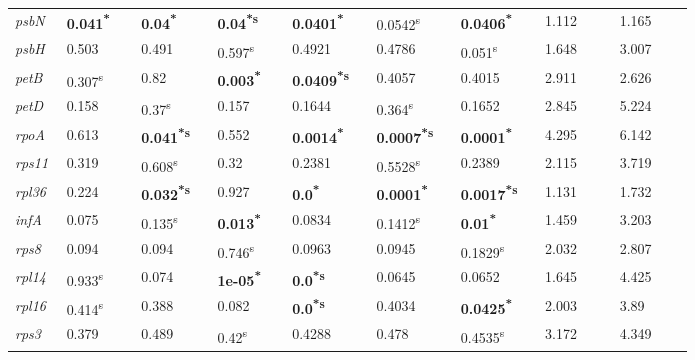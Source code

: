 \documentclass[a4paper]{article}
\begin{document}
\begin{tabular}{p{0.03\linewidth}|p{0.095\linewidth}p{0.095\linewidth}p{0.095\linewidth}|p{0.095\linewidth}p{0.095\linewidth}p{0.095\linewidth}|p{0.095\linewidth}p{0.095\linewidth}}
 \rowcolor{black!20} \textit{psbN} & \textbf{0.041\textsuperscript{*}} & \textbf{0.04\textsuperscript{*}} & \textbf{0.04\textsuperscript{*}\textsuperscript{s}} & \textbf{0.0401\textsuperscript{*}} & 0.0542\textsuperscript{s} & \textbf{0.0406\textsuperscript{*}} & 1.112 & 1.165\\
\textit{psbH} & 0.503 & 0.491 & 0.597\textsuperscript{s} & 0.4921 & 0.4786 & 0.051\textsuperscript{s} & 1.648 & 3.007\\
 \rowcolor{black!20} \textit{petB} & 0.307\textsuperscript{s} & 0.82 & \textbf{0.003\textsuperscript{*}} & \textbf{0.0409\textsuperscript{*}\textsuperscript{s}} & 0.4057 & 0.4015 & 2.911 & 2.626\\
\textit{petD} & 0.158 & 0.37\textsuperscript{s} & 0.157 & 0.1644 & 0.364\textsuperscript{s} & 0.1652 & 2.845 & 5.224\\
 \rowcolor{black!20} \textit{rpoA} & 0.613 & \textbf{0.041\textsuperscript{*}\textsuperscript{s}} & 0.552 & \textbf{0.0014\textsuperscript{*}} & \textbf{0.0007\textsuperscript{*}\textsuperscript{s}} & \textbf{0.0001\textsuperscript{*}} & 4.295 & 6.142\\
\textit{rps11} & 0.319 & 0.608\textsuperscript{s} & 0.32 & 0.2381 & 0.5528\textsuperscript{s} & 0.2389 & 2.115 & 3.719\\
 \rowcolor{black!20} \textit{rpl36} & 0.224 & \textbf{0.032\textsuperscript{*}\textsuperscript{s}} & 0.927 & \textbf{0.0\textsuperscript{*}} & \textbf{0.0001\textsuperscript{*}} & \textbf{0.0017\textsuperscript{*}\textsuperscript{s}} & 1.131 & 1.732\\
\textit{infA} & 0.075 & 0.135\textsuperscript{s} & \textbf{0.013\textsuperscript{*}} & 0.0834 & 0.1412\textsuperscript{s} & \textbf{0.01\textsuperscript{*}} & 1.459 & 3.203\\
 \rowcolor{black!20} \textit{rps8} & 0.094 & 0.094 & 0.746\textsuperscript{s} & 0.0963 & 0.0945 & 0.1829\textsuperscript{s} & 2.032 & 2.807\\
\textit{rpl14} & 0.933\textsuperscript{s} & 0.074 & \textbf{1e-05\textsuperscript{*}} & \textbf{0.0\textsuperscript{*}\textsuperscript{s}} & 0.0645 & 0.0652 & 1.645 & 4.425\\
 \rowcolor{black!20} \textit{rpl16} & 0.414\textsuperscript{s} & 0.388 & 0.082 & \textbf{0.0\textsuperscript{*}\textsuperscript{s}} & 0.4034 & \textbf{0.0425\textsuperscript{*}} & 2.003 & 3.89\\
\textit{rps3} & 0.379 & 0.489 & 0.42\textsuperscript{s} & 0.4288 & 0.478 & 0.4535\textsuperscript{s} & 3.172 & 4.349\\

\end{tabular}
\end{document}

